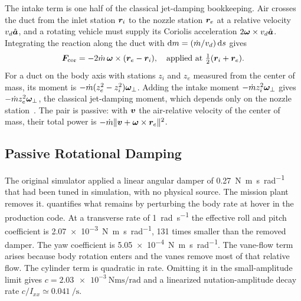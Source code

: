 \documentclass[10pt,letterpaper]{article}
\begin{document}
The intake term is one half of the classical jet-damping bookkeeping.
Air crosses the duct from the inlet station $\bm{r}_i$ to the nozzle station $\bm{r}_e$ at a relative velocity $v_d\hat{\bm{a}}$, and a rotating vehicle must supply its Coriolis acceleration $2\bm{\omega}\times v_d\hat{\bm{a}}$.
Integrating the reaction along the duct with $\mathrm{d}m = (\dot{m}/v_d)\,\mathrm{d}s$ gives
\begin{equation}
\bm{F}_{\text{cor}} = -2\dot{m}\,\bm{\omega}\times(\bm{r}_e - \bm{r}_i), \quad \text{applied at } \tfrac12(\bm{r}_i + \bm{r}_e).
\label{eq:coriolis}
\end{equation}
For a duct on the body axis with stations $z_i$ and $z_e$ measured from the center of mass, its moment is $-\dot{m}(z_e^2 - z_i^2)\bm{\omega}_\perp$.
Adding the intake moment $-\dot{m} z_i^2\bm{\omega}_\perp$ gives $-\dot{m} z_e^2\bm{\omega}_\perp$, the classical jet-damping moment, which depends only on the nozzle station~\cite{thomson1986}.
The pair is passive: with $\bm{v}$ the air-relative velocity of the center of mass, their total power is $-\dot{m}\|\bm{v} + \bm{\omega}\times\bm{r}_e\|^2$.

\subsection{Passive Rotational Damping}
\label{sec:damping}

The original simulator applied a linear angular damper of \SI{0.27}{\newton\metre\second\per\radian} that had been tuned in simulation, with no physical source.
The mission plant removes it.
 quantifies what remains by perturbing the body rate at hover in the production code.
At a transverse rate of \SI{1}{\radian\per\second} the effective roll and pitch coefficient is \SI{2.07e-3}{\newton\metre\second\per\radian}, 131 times smaller than the removed damper. The yaw coefficient is \SI{5.05e-4}{\newton\metre\second\per\radian}.
The vane-flow term arises because body rotation enters  and the vanes remove most of that relative flow.
The cylinder term is quadratic in rate. Omitting it in the small-amplitude limit gives $c=\SI{2.03e-3}{\newton\metre\second\per\radian}$ and a linearized nutation-amplitude decay rate $c/I_{xx}\simeq\SI{0.041}{\per\second}$.
\end{document}
